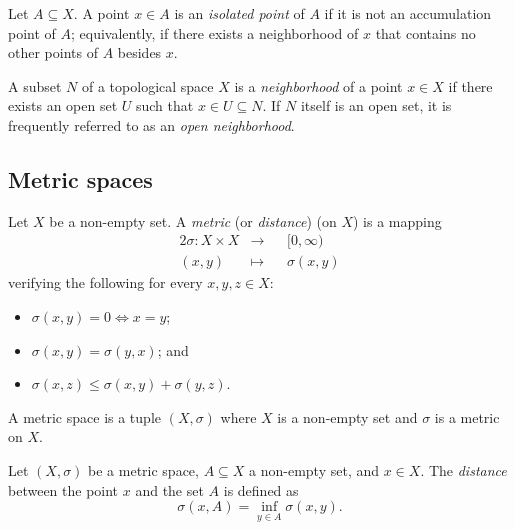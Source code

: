 \begin{definition*}
    Let $A \subseteq X$. A point $x \in A$ is an \emph{isolated point} of $A$ if
    it is not an accumulation point of $A$; equivalently, if there exists a
    neighborhood of $x$ that contains no other points of $A$ besides $x$.
\end{definition*}

\begin{definition*}[Neighborhood]
    A subset $N$ of a topological space $X$ is a \emph{neighborhood} of a point
    $x \in X$ if there exists an open set $U$ such that $x \in U \subseteq N$.
    If $N$ itself is an open set, it is frequently referred to as an \emph{open
    neighborhood}.
\end{definition*}

\subsection*{Metric spaces}

\begin{definition*}
    Let $X$ be a non-empty set. A \emph{metric} (or \emph{distance}) (on $X$) is
    a mapping
    \begin{alignat*}{2}
        \sigma: X \times X &{}\to{}     &&[0, \infty)  \\
                    (x, y) &{}\mapsto{} &&\sigma(x, y)
    \end{alignat*}
    verifying the following for every $x, y, z \in X$:
    \begin{itemize}
        \item $\sigma(x, y) = 0 \iff x = y$;
        \item $\sigma(x, y) = \sigma(y,x)$; and
        \item $\sigma(x, z) \leq \sigma(x, y) + \sigma(y, z)$.
    \end{itemize}
\end{definition*}

\begin{definition*}
    A metric space is a tuple $(X, \sigma)$ where $X$ is a non-empty set and
    $\sigma$ is a metric on $X$.
\end{definition*}

\begin{definition*}
    Let $(X, \sigma)$ be a metric space, $A \subseteq X$ a non-empty set, and $x
    \in X$. The \emph{distance} between the point $x$ and the set $A$ is defined
    as
    \begin{equation*}
        \sigma(x, A) = \inf_{y \in A} \sigma(x, y).
    \end{equation*}
\end{definition*}

